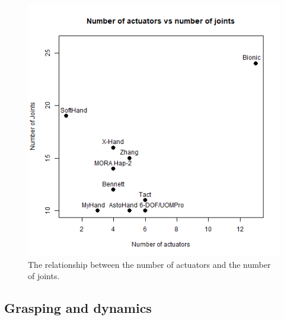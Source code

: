 \documentclass[a4paper, 10pt, conference]{ieeeconf}      %
\begin{document}
\begin{figure}[h]

	\centering
	\includegraphics[scale=0.45]{images/act-joints}
	
	\caption{The relationship between the number of actuators and the number of joints.}
	\label{fig:dia2}
\end{figure}

\subsection{Grasping and dynamics}
\end{document}
